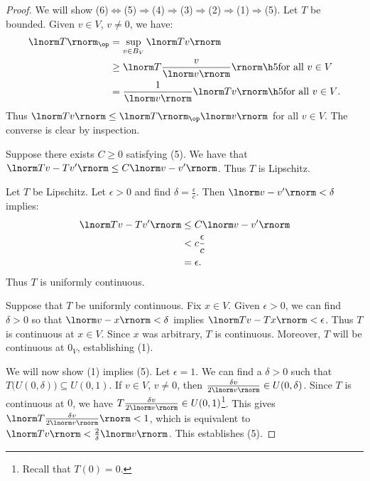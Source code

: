         \begin{proof}
            We will show (6)$\Leftrightarrow$(5)$\Rightarrow$(4)$\Rightarrow$(3)$\Rightarrow$(2)$\Rightarrow$(1)$\Rightarrow$(5). Let $T$ be bounded. Given $v \in V$, $v \neq 0$, we have:
                \begin{equation*}
                \begin{split}
                    \lnorm T \rnorm_{\op} 
                    & = \sup_{v \in B_V}\lnorm Tv \rnorm \\
                    & \geq \lnorm T  \frac{v}{\lnorm v \rnorm} \rnorm \h5\text{for all $v \in V$}\\
                    & = \frac{1}{\lnorm v \rnorm} \lnorm Tv \rnorm \h5\text{for all $v \in V$}.
                \end{split}
                \end{equation*}
            Thus $\lnorm Tv \rnorm \leq \lnorm T \rnorm_{\op} \lnorm v \rnorm$ for all $v \in V$. The converse is clear by inspection.

            Suppose there exists $C \geq 0$ satisfying (5). We have that $\lnorm Tv - Tv' \rnorm \leq C \lnorm v - v' \rnorm$. Thus $T$ is Lipschitz.

            Let $T$ be Lipschitz. Let $\epsilon > 0$ and find $\delta = \frac{\epsilon}{c}$. Then $\lnorm v - v' \rnorm < \delta$ implies:
                \begin{equation*}
                \begin{split}
                    \lnorm Tv - Tv' \rnorm
                    & \leq C \lnorm v - v' \rnorm \\
                    & < c \frac{\epsilon}{c} \\
                    & = \epsilon.
                \end{split}
                \end{equation*}
            Thus $T$ is uniformly continuous.

            Suppose that $T$ be uniformly continuous. Fix $x \in V$. Given $\epsilon > 0$, we can find $\delta > 0$ so that $\lnorm v - x \rnorm < \delta$ implies $\lnorm Tv - Tx \rnorm < \epsilon$. Thus $T$ is continuous at $x \in V$. Since $x$ was arbitrary, $T$ is continuous. Moreover, $T$ will be continuous at $0_V$, establishing (1).
            
            We will now show (1) implies (5). Let $\epsilon = 1$. We can find a $\delta > 0$ such that $T\bigl(U(0,\delta)\bigr) \subseteq U(0,1)$. If $v \in V$, $v \neq 0$, then $\frac{\delta v}{2 \lnorm v \rnorm} \in U(0,\delta)$. Since $T$ is continuous at $0$, we have $T\frac{\delta v}{2 \lnorm v \rnorm} \in U(0,1)$\footnote{Recall that $T(0) = 0$.}. This gives $\lnorm T \frac{\delta v}{2 \lnorm v \rnorm} \rnorm < 1$, which is equivalent to $\lnorm Tv \rnorm < \frac{2}{\delta}\lnorm v \rnorm$. This establishes (5).
        \end{proof}

